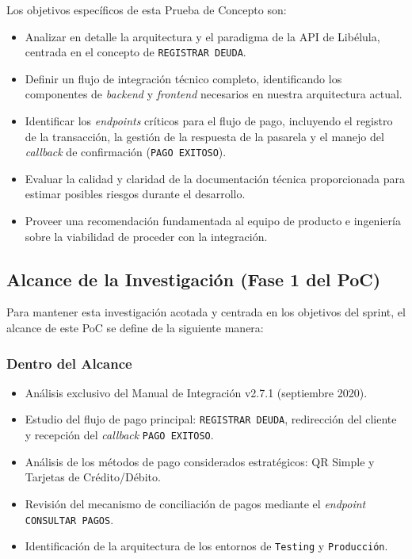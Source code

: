         Los objetivos específicos de esta Prueba de Concepto son:
        \begin{itemize}
            \item Analizar en detalle la arquitectura y el paradigma de la API de Libélula, centrada en el concepto de \texttt{REGISTRAR DEUDA}.
            \item Definir un flujo de integración técnico completo, identificando los componentes de \emph{backend} y \emph{frontend} necesarios en nuestra arquitectura actual.
            \item Identificar los \emph{endpoints} críticos para el flujo de pago, incluyendo el registro de la transacción, la gestión de la respuesta de la pasarela y el manejo del \emph{callback} de confirmación (\texttt{PAGO EXITOSO}).
            \item Evaluar la calidad y claridad de la documentación técnica proporcionada para estimar posibles riesgos durante el desarrollo.
            \item Proveer una recomendación fundamentada al equipo de producto e ingeniería sobre la viabilidad de proceder con la integración.
        \end{itemize}

    \subsection{Alcance de la Investigación (Fase 1 del PoC)}
        Para mantener esta investigación acotada y centrada en los objetivos del sprint, el alcance de este PoC se define de la 
        siguiente manera:

        \subsubsection*{Dentro del Alcance}
            \begin{itemize}
                \item Análisis exclusivo del Manual de Integración v2.7.1 (septiembre 2020).
                \item Estudio del flujo de pago principal: \texttt{REGISTRAR DEUDA}, redirección del cliente y recepción del \emph{callback} \texttt{PAGO EXITOSO}.
                \item Análisis de los métodos de pago considerados estratégicos: QR Simple y Tarjetas de Crédito/Débito.
                \item Revisión del mecanismo de conciliación de pagos mediante el \emph{endpoint} \texttt{CONSULTAR PAGOS}.
                \item Identificación de la arquitectura de los entornos de \texttt{Testing} y \texttt{Producción}.
            \end{itemize}

